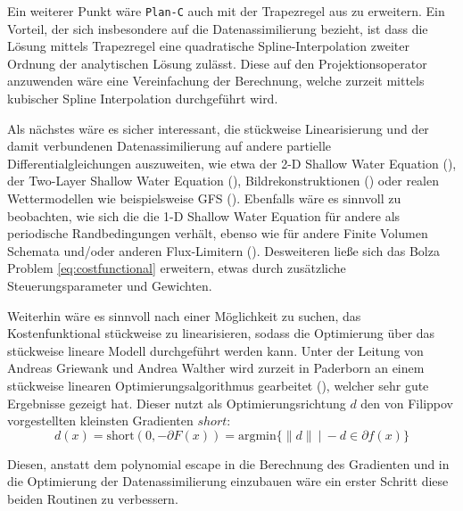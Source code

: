 Ein weiterer Punkt wäre \texttt{Plan-C} auch mit der Trapezregel aus \cite[S.23 (15)]{monster} zu erweitern. Ein Vorteil, der sich insbesondere auf die Datenassimilierung bezieht, ist dass die Lösung mittels Trapezregel eine quadratische Spline-Interpolation zweiter Ordnung der analytischen Lösung zulässt. Diese auf den Projektionsoperator anzuwenden wäre eine Vereinfachung der Berechnung, welche zurzeit mittels kubischer Spline Interpolation durchgeführt wird.

Als nächstes wäre es sicher interessant, die stückweise Linearisierung und der damit verbundenen Datenassimilierung auf andere partielle Differentialgleichungen auszuweiten, wie etwa der 2-D Shallow Water Equation (\cite[\S 3]{kurganov2007second}), der Two-Layer Shallow Water Equation (\cite{kurganov2009central}), Bildrekonstruktionen (\cite{korotaev2008retrieving}) oder realen Wettermodellen wie beispielsweise GFS (\cite{gfs}). 
Ebenfalls wäre es sinnvoll zu beobachten, wie sich die die 1-D Shallow Water Equation für andere als periodische Randbedingungen verhält, ebenso wie für andere Finite Volumen Schemata und/oder anderen Flux-Limitern (\cite{juntasaro2004comparative}).
Desweiteren ließe sich das Bolza Problem \eqref{eq:costfunctional} erweitern, etwas durch zusätzliche Steuerungsparameter und Gewichten. 

Weiterhin wäre es sinnvoll nach einer Möglichkeit zu suchen, das Kostenfunktional stückweise zu linearisieren, sodass die Optimierung über das stückweise lineare Modell durchgeführt werden kann.
Unter der Leitung von Andreas Griewank und Andrea Walther wird zurzeit in Paderborn an einem stückweise linearen Optimierungsalgorithmus gearbeitet (\cite{griewank2014lipschitz}), welcher sehr gute Ergebnisse gezeigt hat. 
Dieser nutzt als Optimierungsrichtung $d$ den von Filippov vorgestellten kleinsten Gradienten $short$:
\[
d(x) = \text{short}(0,-\partial F(x)) = \text{argmin} \lbrace \|d\| ~|~ -d \in \partial f(x) \rbrace
\]

Diesen, anstatt dem polynomial escape in die Berechnung des Gradienten und in die Optimierung der Datenassimilierung einzubauen wäre ein erster Schritt diese beiden Routinen zu verbessern.

